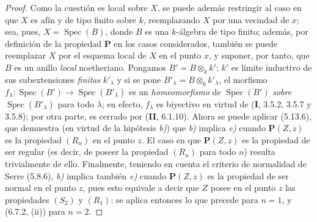\begin{proof}
Como la cuestión es local sobre $X$, se puede además restringir al caso en que $X$
es afín y de tipo finito sobre $k$, reemplazando $X$ por una vecindad de $x$;
sea, pues, $X=\operatorname{Spec}(B)$, donde $B$ es una $k$-álgebra de tipo finito;
además, por definición de la propiedad $\boldsymbol{P}$ en los casos considerados, también se
puede reemplazar $X$ por el esquema local de $X$ en el punto $x$, y suponer, por
tanto, que $B$ es un anillo \emph{local} noetheriano. Pongamos $B'=B\otimes_k k'$; $k'$
es límite inductivo de sus subextensiones \emph{finitas} $k'_\lambda$ y si se pone
$B'_\lambda=B\otimes_k k'_\lambda$, el morfismo
$f_\lambda:\operatorname{Spec}(B')\to\operatorname{Spec}(B'_\lambda)$ es
un \emph{homeomorfismo} de $\operatorname{Spec}(B')$ \emph{sobre}
$\operatorname{Spec}(B'_\lambda)$ para todo $\lambda$;
en efecto, $f_\lambda$ es biyectivo en virtud de (\textbf I, 3.5.2, 3.5.7 y 3.5.8);
por otra parte, es cerrado por (\textbf{II}, 6.1.10). Ahora se puede aplicar
(5.13.6), que demuestra (en virtud de la hipótesis \emph{b)}) que \emph{b)} implica \emph{e)} cuando
$\boldsymbol{P}(Z,z)$ es la propiedad $(R_n)$ en el punto $z$. El caso en que $\boldsymbol{P}(Z,z)$ es la
propiedad de ser regular (es decir, de poseer la propiedad $(R_n)$ para todo $n$)
resulta trivialmente de ello. Finalmente, teniendo en cuenta el criterio de
normalidad de Serre (5.8.6), \emph{b)} implica también \emph{e)} cuando $\boldsymbol{P}(Z,z)$ es la propiedad
de ser normal en el punto $z$, pues esto equivale a decir que $Z$ posee en el
punto $z$ las propiedades $(S_2)$ y $(R_1)$: se aplica entonces lo que precede
para $n=1$, y (6.7.2, (ii)) para $n=2$.
\end{proof}
